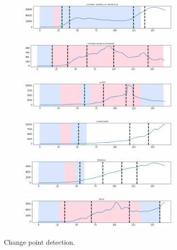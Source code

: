 \documentclass{article}
\begin{document}
\begin{figure}[ht!]
    \begin{subfigure}{\textwidth}
    	\centering
        \includegraphics[width=0.9\textwidth]{_United States of America.png}
    \end{subfigure}
     \begin{subfigure}{\textwidth}
    	\centering
        \includegraphics[width=0.9\textwidth]{_United Arab Emirates.png}
    \end{subfigure}
    \begin{subfigure}{\textwidth}
    	\centering
        \includegraphics[width=0.9\textwidth]{_Chile.png}
    \end{subfigure}
    \begin{subfigure}{\textwidth}
    	\centering
        \includegraphics[width=0.9\textwidth]{_Colombia.png}
    \end{subfigure}
    \begin{subfigure}{\textwidth}
    	\centering
        \includegraphics[width=0.9\textwidth]{_Mexico.png}
    \end{subfigure}
    \begin{subfigure}{\textwidth}
    	\centering
        \includegraphics[width=0.9\textwidth]{_Peru.png}
    \end{subfigure}
  
    \caption{Change point detection.}
\label{fig:changepoint2}
\end{figure}
\end{document}
